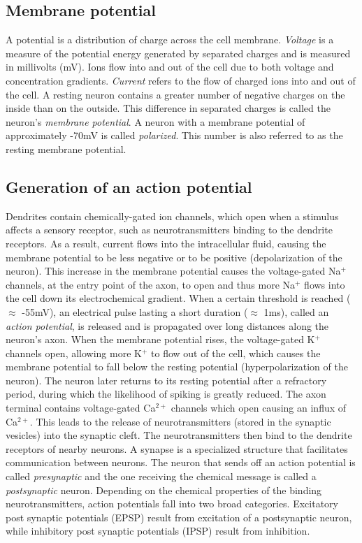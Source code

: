 \subsection{Membrane potential}
A potential is a distribution of charge across the cell membrane.
\textit{Voltage} is a measure of the potential energy generated by separated charges and is measured in millivolts (mV). Ions flow into and out of the cell due to both voltage and concentration gradients. \textit{Current} refers to the flow of charged ions into and out of the cell. A resting neuron contains a greater number of negative charges on the inside than on the outside. 
This difference in separated charges is called the neuron's \textit{membrane potential}. A neuron with a membrane potential of approximately -70mV is called \textit{polarized}. This number is also referred to as the resting membrane potential.  

\subsection{Generation of an action potential}
Dendrites contain chemically-gated ion channels, which open when 
a stimulus affects a sensory receptor, such as neurotransmitters binding to the dendrite receptors. As a result, current flows into the intracellular fluid, causing the membrane potential to be less negative or to be positive (depolarization of the neuron). 
This increase in the membrane potential causes the voltage-gated Na$^{+}$ channels, at the entry point of the axon, to open and thus more Na$^{+}$ flows into the cell down its electrochemical  gradient. When a certain threshold is reached ($\approx$ -55mV), an electrical pulse lasting  a short duration ($\approx$ 1ms),  called an \textit{action potential}, is released and is propagated over long distances along the neuron's axon. When the membrane potential rises, the voltage-gated K$^{+}$ channels open, allowing more K$^{+}$ to flow out of the cell, which causes the membrane potential to fall below the resting potential (hyperpolarization of the neuron). The neuron later returns to its resting potential after a refractory period, during which the likelihood of spiking is greatly reduced. The axon terminal contains voltage-gated Ca$^{2+}$ channels which open causing an influx of Ca$^{2+}$. This leads to the release of 
neurotransmitters (stored in the synaptic vesicles) into the synaptic cleft.
The neurotransmitters then bind to the dendrite receptors of nearby neurons.
A synapse is a specialized structure that facilitates communication between neurons. The neuron that sends off an action potential is called \textit{presynaptic} and the one receiving the chemical message is called a \textit{postsynaptic} neuron. Depending on the chemical properties of the binding neurotransmitters, action potentials fall into two broad categories. Excitatory post synaptic potentials (EPSP) result from excitation of a postsynaptic neuron, while inhibitory post synaptic potentials (IPSP) result from inhibition.

